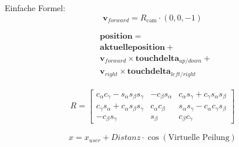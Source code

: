 Einfache Formel:
\begin{equation}
    \mathbf{v}_{forward} = R_{\text{cam}} \cdot (0, 0, -1)
\end{equation}

\begin{equation}
    \begin{aligned}
    & \mathbf{position} = \\
    &    \mathbf{aktuelle position} + \\
    &    \mathbf{v}_{forward} \times \mathbf{touch delta}_{up/down} + \\
    &    \mathbf{v}_{right} \times \mathbf{touch delta}_{left/right}
    \end{aligned}
\end{equation}

\begin{align*}
    R = \begin{bmatrix} 
        c_\alpha c_\gamma - s_\alpha s_\beta s_\gamma & -c_\beta s_\alpha & c_\alpha s_\gamma + c_\gamma s_\alpha s_\beta \\
        c_\gamma s_\alpha + c_\alpha s_\beta s_\gamma & c_\alpha c_\beta & s_\alpha s_\gamma - c_\alpha c_\gamma s_\beta \\
        -c_\beta s_\gamma & s_\beta & c_\beta c_\gamma
    \end{bmatrix}
\end{align*}

\[
x = x_{user} + \textit{Distanz} \cdot \cos(\text{Virtuelle Peilung})
\]